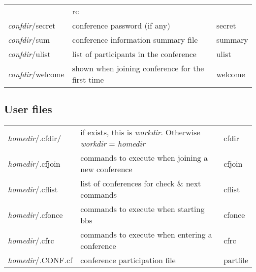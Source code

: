 \documentclass[twoside]{report}
\begin{document}
\begin{supertabular}{lp{7cm}l}
                             & rc \\
            {\em confdir}/secret     
                             & conference password (if any)
                             & secret \\
            {\em confdir}/sum        
                             & conference information summary file
                             & summary \\
            {\em confdir}/ulist      
                             & list of participants in the conference
                             & ulist \\
            {\em confdir}/welcome
                             & shown when joining conference for the first time 
                             & welcome \\
          \end{supertabular}

     \subsection{User files}
         \tablelasttail{\hline}
         \begin{supertabular}{lp{7cm}l}
   
            {\em homedir}/.cfdir/    
                        & if exists, this is {\em workdir}.  Otherwise 
                         {\em workdir} = {\em homedir}
                        & cfdir \\
            {\em homedir}/.cfjoin    
                        & commands to execute when joining a new conference  
                        & cfjoin \\
            {\em homedir}/.cflist    
                        & list of conferences for check \& next commands      
                        & cflist \\
            {\em homedir}/.cfonce    
                        & commands to execute when starting bbs              
                        & cfonce \\
            {\em homedir}/.cfrc      
                        & commands to execute when entering a conference     
                        & cfrc \\
            {\em homedir}/.CONF.cf   
                        & conference participation file                      
                        & partfile \\
         \end{supertabular}
\end{document}

